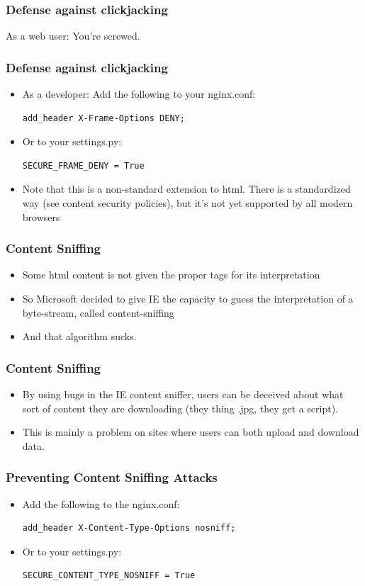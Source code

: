 \documentclass[9pt]{beamer}
\begin{document}
\begin{frame}[fragile]
\frametitle{Defense against clickjacking}
As a web user: You're screwed.
\end{frame}

\begin{frame}[fragile]
\frametitle{Defense against clickjacking}
\begin{itemize}
\item As a developer: Add the following to your nginx.conf:
\begin{verbatim}
add_header X-Frame-Options DENY;
\end{verbatim}
\pause
\item Or to your settings.py:
\begin{verbatim}
SECURE_FRAME_DENY = True
\end{verbatim}
\pause
\item Note that this is a non-standard extension to html. There is a standardized way (see content security policies), but it's not yet supported by all modern browsers
\end{itemize}
\end{frame}

\begin{frame}[fragile]
\frametitle{Content Sniffing}
\begin{itemize}
\item Some html content is not given the proper tags for its interpretation
\pause
\item So Microsoft decided to give IE the capacity to guess the interpretation of a byte-stream, called content-sniffing
\pause
\item And that algorithm sucks.
\end{itemize}
\end{frame}

\begin{frame}[fragile]
\frametitle{Content Sniffing}
\begin{itemize}
\item By using bugs in the IE content sniffer, users can be deceived about what sort of content they are downloading (they thing .jpg, they get a script).
\pause
\item This is mainly a problem on sites where users can both upload and download data.
\end{itemize}
\end{frame}

\begin{frame}[fragile]
\frametitle{Preventing Content Sniffing Attacks}
\begin{itemize}
\item Add the following to the nginx.conf:
\begin{verbatim}
add_header X-Content-Type-Options nosniff;
\end{verbatim}
\pause
\item Or to your settings.py:
\begin{verbatim}
SECURE_CONTENT_TYPE_NOSNIFF = True
\end{verbatim}
\end{itemize}
\end{frame}
\end{document}

